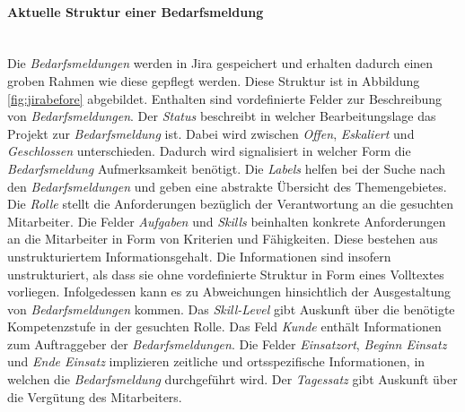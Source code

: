 \paragraph{Aktuelle Struktur einer Bedarfsmeldung}\mbox{} \\
Die \emph{Bedarfsmeldungen} werden in Jira gespeichert und erhalten dadurch einen groben Rahmen wie diese gepflegt werden. Diese Struktur ist in Abbildung \ref{fig:jirabefore} abgebildet. Enthalten sind vordefinierte Felder zur Beschreibung von \emph{Bedarfsmeldungen}. Der \emph{Status} beschreibt in welcher Bearbeitungslage das Projekt zur \emph{Bedarfsmeldung} ist. Dabei wird zwischen \emph{Offen}, \emph{Eskaliert} und \emph{Geschlossen} unterschieden. Dadurch wird signalisiert in welcher Form die \emph{Bedarfsmeldung} Aufmerksamkeit benötigt. Die \emph{Labels} helfen bei der Suche nach den \emph{Bedarfsmeldungen} und geben eine abstrakte Übersicht des Themengebietes. Die \emph{Rolle} stellt die Anforderungen bezüglich der Verantwortung an die gesuchten Mitarbeiter. Die Felder \emph{Aufgaben} und \emph{Skills} beinhalten konkrete Anforderungen an die Mitarbeiter in Form von Kriterien und Fähigkeiten. Diese bestehen aus unstrukturiertem Informationsgehalt. Die Informationen sind insofern unstrukturiert, als dass sie ohne vordefinierte Struktur in Form eines Volltextes vorliegen. Infolgedessen kann es zu Abweichungen hinsichtlich der Ausgestaltung von \emph{Bedarfsmeldungen} kommen. Das \emph{Skill-Level} gibt Auskunft über die benötigte Kompetenzstufe in der gesuchten Rolle. Das Feld \emph{Kunde} enthält Informationen zum Auftraggeber der \emph{Bedarfsmeldungen}. Die Felder \emph{Einsatzort}, \emph{Beginn Einsatz} und \emph{Ende Einsatz} implizieren zeitliche und ortsspezifische Informationen, in welchen die \emph{Bedarfsmeldung} durchgeführt wird. Der \emph{Tagessatz} gibt Auskunft über die Vergütung des Mitarbeiters.
